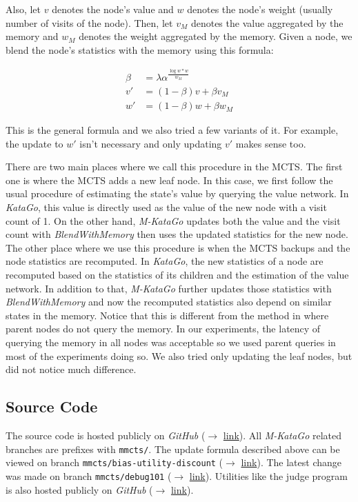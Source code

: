 \documentclass{article}
\newcommand{\katago}{\emph{KataGo}\xspace}
\newcommand{\mkatago}{\emph{M-KataGo}\xspace}
\begin{document}
Also, let $v$ denotes the node's value and $w$ denotes the node's weight (usually number of visits of the node).
Then, let $v_M$ denotes the value aggregated by the memory and $w_M$ denotes the weight aggregated by the memory.
Given a node, we blend the node's statistics with the memory using this formula:

\begin{align*}
    \beta & = \lambda \alpha^{\frac{\log{w} * w}{w_M}} \\
    v'    & = (1 - \beta) v + \beta v_M                \\
    w'    & = (1 - \beta) w + \beta w_M
\end{align*}

This is the general formula and we also tried a few variants of it.
For example, the update to $w'$ isn't necessary and only updating $v'$ makes sense too.

There are two main places where we call this procedure in the MCTS.
The first one is where the MCTS adds a new leaf node.
In this case, we first follow the usual procedure of estimating the state's value by querying the value network.
In \katago, this value is directly used as the value of the new node with a visit count of 1.
On the other hand, \mkatago updates both the value and the visit count with \textit{BlendWithMemory} then uses the updated statistics for the new node.
The other place where we use this procedure is when the MCTS backups and the node statistics are recomputed.
In \katago, the new statistics of a node are recomputed based on the statistics of its children and the estimation of the value network.
In addition to that, \mkatago further updates those statistics with \textit{BlendWithMemory} and now the recomputed statistics also depend on similar states in the memory.
Notice that this is different from the method in \cite{xiao_memory-augmented_2018} where parent nodes do not query the memory.
In our experiments, the latency of querying the memory in all nodes was acceptable so we used parent queries in most of the experiments doing so.
We also tried only updating the leaf nodes, but did not notice much difference.

\subsection{Source Code}
The source code is hosted publicly on \textit{GitHub} ($\rightarrow$ \href{https://github.com/uduse/KataGo}{link}).
All \mkatago related branches are prefixes with \texttt{mmcts/}.
The update formula described above can be viewed on branch \texttt{mmcts/bias-utility-discount} ($\rightarrow$ \href{https://bit.ly/3swcotj}{link}).
The latest change was made on branch \texttt{mmcts/debug101} ($\rightarrow$ \href{https://github.com/uduse/KataGo/tree/mmcts/debug101}{link}).
Utilities like the judge program is also hosted publicly on \textit{GitHub} ($\rightarrow$ \href{https://github.com/uduse/gogui-twogtp-tournaments-setup}{link}).
\end{document}
